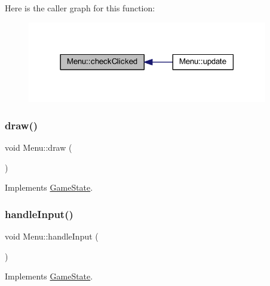 Here is the caller graph for this function\+:
\nopagebreak
\begin{figure}[H]
\begin{center}
\leavevmode
\includegraphics[width=297pt]{class_menu_a1b4d7af621c036afa3d9758e8accbc16_icgraph}
\end{center}
\end{figure}
\mbox{\label{class_menu_a2cd7ab9901a8f42a3ae977d0774398a6}} 
\subsubsection{\texorpdfstring{draw()}{draw()}}
{\footnotesize\ttfamily void Menu\+::draw (\begin{DoxyParamCaption}{ }\end{DoxyParamCaption})\hspace{0.3cm}{\ttfamily [virtual]}}



Implements \hyperlink{class_game_state_ac872d748df12ac36d7a42a191997e4f7}{Game\+State}.

\mbox{\label{class_menu_a28296c3978c880ea9288fc97a869795d}} 
\subsubsection{\texorpdfstring{handle\+Input()}{handleInput()}}
{\footnotesize\ttfamily void Menu\+::handle\+Input (\begin{DoxyParamCaption}{ }\end{DoxyParamCaption})\hspace{0.3cm}{\ttfamily [virtual]}}



Implements \hyperlink{class_game_state_a970b55edd5a1da31ea0f7113e2c1f85a}{Game\+State}.

